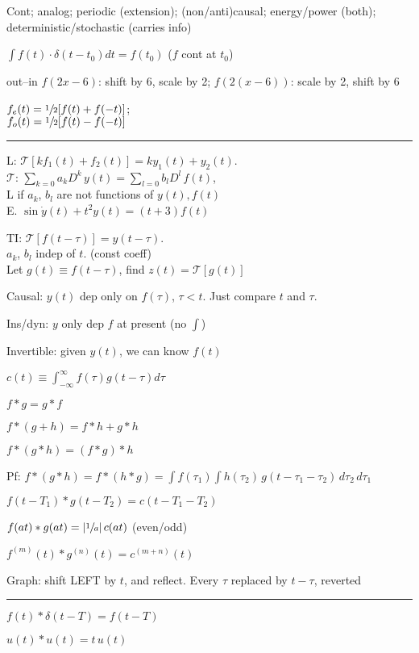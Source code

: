\documentclass[4pt]{article}
\theoremstyle{definition}
\theoremstyle{definition}
\begin{document}
\begin{multicols}{3}
    Cont; 
    analog; 
    periodic (extension); 
    (non/anti)causal; 
    energy/power (both); 
    deterministic/stochastic (carries info)

    $\int f(t)\cdot \delta(t - t_0) dt = f(t_0)$ ($f$ cont at $t_0$)
    

    out--in  $f(2x-6)$: shift by 6, scale by 2; $f(2(x-6))$: scale by 2, shift by 6

    $f_e(t) = \sfrac{1}{2}[f(t) + f(-t)]$; \\
    $f_o(t) = \sfrac{1}{2}[f(t) - f(-t)]$
\rule{\linewidth}{0.5pt}
    L: $\mathcal{T}[kf_1(t) + f_2(t)] = ky_1(t) + y_2(t)$.\\
    $\mathcal{T}$: $\sum_{k=0}a_k D^k \, y(t) = \sum_{l=0}b_lD^l\, f(t)$,\\
    L if $a_k$, $b_l$ are not functions of $y(t), f(t)$\\
    E. $\sin\dot{y}(t) + t^2 y(t) = (t+3) f(t)$
    
    TI: $\mathcal{T}[f(t-\tau)] = y(t-\tau)$.\\
    $a_k$, $b_l$ indep of $t$. (const coeff)\\
    Let $g(t)\equiv f(t-\tau)$, find $z(t) = \mathcal{T}[g(t)]$


    Causal: $y(t)$ dep only on $f(\tau)$, $\tau < t$. 
    Just compare $t$ and $\tau$.
    
    Ins/dyn: $y$ only dep $f$ at present (no $\int$)
    
    Invertible: given $y(t)$, we can know $f(t)$

    $c(t) \equiv \int_{-\infty}^{\infty} f(\tau) g(t-\tau) d\tau$

    $f * g = g * f$
    
    $f * (g + h) = f * h + g * h$
    
    $f * (g * h) = (f * g) * h$

        Pf: $f * (g * h) = f * (h * g) = \int f(\tau_1) \int h(\tau_2)\, g(t - \tau_1 - \tau_2) \, d\tau_2 \, d\tau_1$
    
     $f(t - T_1) * g(t - T_2) = c(t - T_1 - T_2)$

     $f(at) * g(at) = |\sfrac{1}{a}|\, c(at)$ (even/odd)

     $f^{(m)} (t) * g^{(n)} (t) = c^{(m+n)}(t)$


    Graph: shift LEFT by $t$, and reflect. Every $\tau$ replaced by $t-\tau$, reverted
\rule{\linewidth}{0.5pt}
    $f(t) * \delta(t-T) = f(t-T)$
    
    $u(t) * u(t) = t \, u(t)$


\end{multicols}
\end{document}
